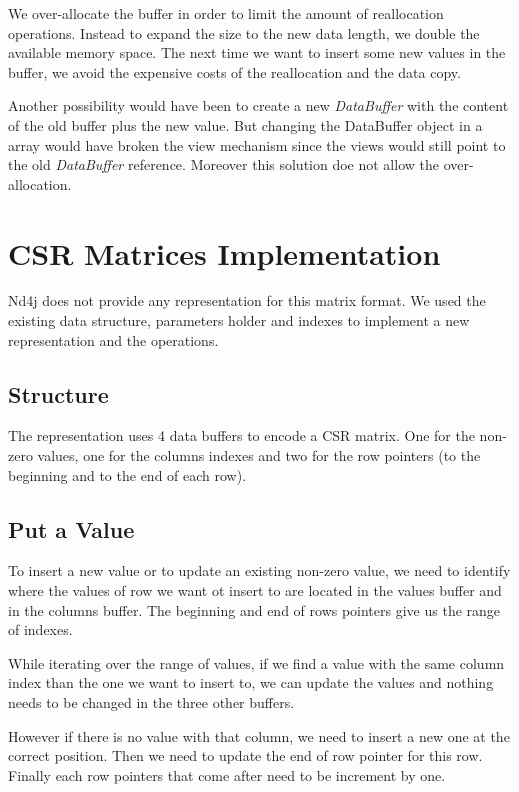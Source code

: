 We over-allocate the buffer in order to limit the amount of reallocation operations. Instead to expand the size to the new data length, we double the available memory space. The next time we want to insert some new values in the buffer, we avoid the expensive costs of the reallocation and the data copy.

Another possibility would have been to create a new \textit{DataBuffer} with the content of the old buffer plus the new value. But changing the DataBuffer object in a array would have broken the view mechanism since the views would still point to the old \textit{DataBuffer} reference. Moreover this solution doe not allow the over-allocation.


\section{CSR Matrices Implementation}

Nd4j does not provide any representation for this matrix format. We used the existing data structure, parameters holder and indexes to implement a new representation and the operations.

\subsection{Structure}

The representation uses 4 data buffers to encode a CSR matrix. One for the non-zero values, one for the columns indexes and two for the row pointers (to the beginning and to the end of each row).

\subsection{Put a Value}

To insert a new value or to update an existing non-zero value, we need to identify where the values of row we want ot insert to are located in the values buffer and in the columns buffer. The beginning and end of rows pointers give us the range of indexes.

While iterating over the range of values, if we find a value with the same column index than the one we want to insert to, we can update the values and nothing needs to be changed in the three other buffers. 

However if there is no value with that column, we need to insert a new one at the correct position. Then we need to update the end of row pointer for this row. Finally each row pointers that come after need to be increment by one.

